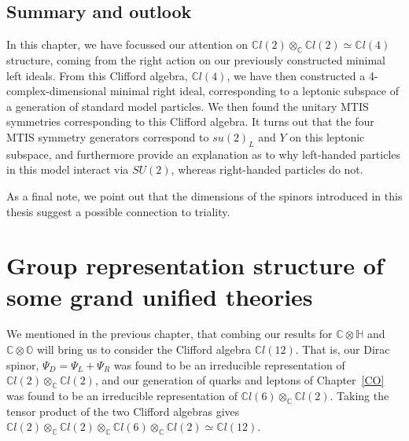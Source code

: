 \documentclass[letterpaper,12pt,titlepage,oneside,final]{book}
\newcommand{\C}{\mathbb{C}}
\newcommand{\CH}{\mathbb{C}\otimes\mathbb{H}}
\newcommand{\CO}{\mathbb{C}\otimes\mathbb{O}}
\newcommand{\CLsix}{\mathbb{C}l(6)}
\newcommand{\CLtwo}{\mathbb{C}l(2)}
\newcommand{\CLfour}{\mathbb{C}l(4)}
\newcommand{\CLtwelve}{\mathbb{C}l(12)}
\begin{document}
 \newpage

\section{Summary  and outlook}

In this chapter, we have focussed our attention on $\CLtwo\otimes_{\C}\CLtwo\simeq\CLfour$ structure, coming from the right action on our previously constructed minimal left ideals.  From this Clifford algebra, $\CLfour$, we have then constructed a 4-complex-dimensional minimal right ideal, corresponding to a leptonic subspace of a generation of standard model particles.  We then found the unitary MTIS symmetries corresponding to this Clifford algebra.  It turns out that the four MTIS symmetry generators correspond to  $su(2)_L$ and $Y$ on this leptonic subspace, and furthermore provide an explanation as to why left-handed particles in this model interact via $SU(2)$, whereas right-handed particles do not.  



As a final note, we point out that the dimensions of the spinors introduced in this thesis suggest  a possible connection to triality.







\chapter{Group representation structure of some grand unified theories \label{GUT}}



We mentioned in the previous chapter, that combing our results for $\CH$ and $\CO$ will bring us to consider the Clifford algebra $\CLtwelve$.  That is, our Dirac spinor, $\Psi_D = \Psi_L+\Psi_R$ was found to be an irreducible representation of $\CLtwo \otimes_{\C} \CLtwo$, and our generation of quarks and leptons of Chapter~\ref{CO} was found to be an irreducible representation of $\CLsix \otimes_{\C} \CLtwo$.  Taking the tensor product of the two Clifford algebras gives $\CLtwo \otimes_{\C} \CLtwo \otimes_{\C} \CLsix \otimes_{\C} \CLtwo\simeq\CLtwelve$.
\end{document}
